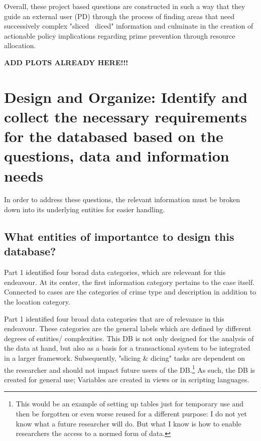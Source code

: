 \documentclass[a4paper]{article}
\begin{document}
Overall, these project based questions are constructed in such a way that they guide an external user (PD) through the process of finding areas that need successively complex "sliced \ diced" information and culminate in the creation of actionable policy implications regarding prime prevention through resource allocation.


\textbf{ADD PLOTS ALREADY HERE!!!}

\section{Design and Organize: Identify and collect the necessary requirements for the databased based on the questions, data and information needs}
In order to address these questions, the relevant information must be broken down into its underlying entities for easier handling. 

\subsection{What entities of importantce to design this database?}
Part 1 identified four borad data categories, which are releveant for this endeavour. At its center, the first information category pertains to the case itself. Connected to cases are the categories of crime type and description in addition to the location category. 
 
 
 
 


Part 1 identified four broad data categories that are of relevance in this endeavour. These categories are the general labels which are defined by different degrees of entities/ complexities. This DB is not only designed for the analysis of the data at hand, but also as a basis for a transactional system to be integrated in a larger framework. Subsequently, "slicing \& dicing" tasks are dependent on the researcher and should not impact future users of the DB.\footnote{This would be an example of setting up tables just for temporary use and then be forgotten or even worse reused for a different purpose: I do not yet know what a future researcher will do. But what I know is how to enable researchers the access to a normed form of data.} As such, the DB is created for general use; Variables are created in views or in scripting languages. 
\end{document}
